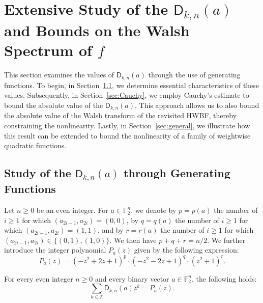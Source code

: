 \documentclass[runningheads,orivec]{llncs}
\newcommand{\Dkna}[3]{\mathsf{D}_{#2,#1}(a)}
\newcommand{\F}{\mathbb{F}}
\newcommand{\hwbf}{\textsf{HWBF}}
\newcommand{\Z}{\mathbb{Z}}
\let\geq=\geqslant
\begin{document}
    \section{Extensive Study of the $\Dkna nka$ and Bounds on the Walsh Spectrum of $f$}\label{sec:dnk}
    
    This section examines the values of $\Dkna nka$ through the use of generating functions. To begin, in Section~\ref{sec:genfunc}, we determine essential characteristics of these values. Subsequently, in Section~\ref{sec:Cauchy}, we employ Cauchy's estimate to bound the absolute value of the $\Dkna nka$. This approach allows us to also bound the absolute value of the Walsh transform of the revisited \hwbf{}, thereby constraining the nonlinearity. Lastly, in Section~\ref{sec:general}, we illustrate how this result can be extended to bound the nonlinearity of a family of weightwise quadratic functions.
    
    \subsection{Study of the $\Dkna nka$ through Generating Functions}\label{sec:genfunc}
    
    \begin{definition}\label{defi:P_a}
        Let $n\geq 0$ be an even integer. For $a\in\F_2^n$, we denote by $p=p(a)$ the number of $i\geq 1$ for which $(a_{2i-1},a_{2i})=(0,0)$, by $q=q(a)$ the number of $i\geq 1$ for which $(a_{2i-1},a_{2i})=(1,1)$, and by $r=r(a)$ the number of $i\geq 1$ for which $(a_{2i-1},a_{2i})\in\{(0,1),(1,0)\}$. We then have $p+q+r=n/2$. We further introduce the integer polynomial $P_a(z)$ given by the following expression:
        \[
        	P_a(z)=(-z^2+2z+1)^{p}\cdot(-z^2-2z+1)^{q}\cdot(z^2+1)^{r}.
        \]
    \end{definition}
    
    \begin{proposition}\label{proposition:generating_fct}
    	For every even integer $n\geq 0$ and every binary vector $a\in\F_2^n$, the following holds:
        \[
            \sum_{k\in\Z}\Dkna nka z^k= P_a(z).
        \]
    \end{proposition}
    
\end{document}
